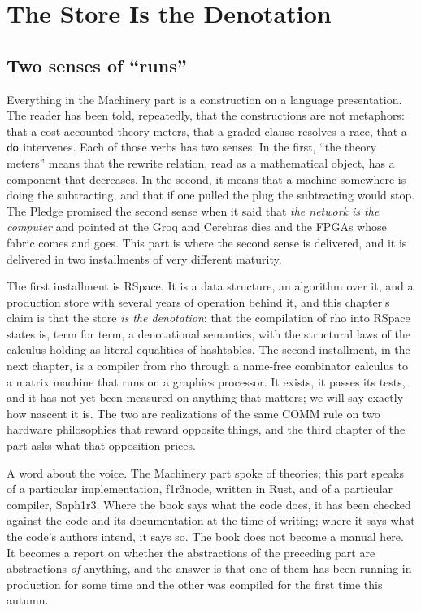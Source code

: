 \chapter{The Store Is the Denotation}
\label{ch:rspace}

\section{Two senses of ``runs''}

Everything in the Machinery part is a construction on a language presentation. The
reader has been told, repeatedly, that the constructions are not metaphors: that a
cost-accounted theory meters, that a graded clause resolves a race, that a $\textsf{do}$
intervenes. Each of those verbs has two senses. In the first, ``the theory meters'' means
that the rewrite relation, read as a mathematical object, has a component that decreases.
In the second, it means that a machine somewhere is doing the subtracting, and that if one
pulled the plug the subtracting would stop. The Pledge promised the second sense when it
said that \emph{the network is the computer} and pointed at the Groq and Cerebras dies
and the FPGAs whose fabric comes and goes. This part is where the second sense is
delivered, and it is delivered in two installments of very different maturity.

The first installment is RSpace. It is a data structure, an algorithm over it, and a
production store with several years of operation behind it, and this chapter's claim is
that the store \emph{is the denotation}: that the compilation of rho into RSpace states is,
term for term, a denotational semantics, with the structural laws of the calculus holding
as literal equalities of hashtables. The second installment, in the next chapter, is a
compiler from rho through a name-free combinator calculus to a matrix machine that runs on
a graphics processor. It exists, it passes its tests, and it has not yet been measured on
anything that matters; we will say exactly how nascent it is. The two are realizations of
the same COMM rule on two hardware philosophies that reward opposite things, and the third
chapter of the part asks what that opposition prices.

A word about the voice. The Machinery part spoke of theories; this part speaks of a
particular implementation, f1r3node, written in Rust, and of a particular compiler,
Saph1r3. Where the book says what the code does, it has been checked against the code and
its documentation at the time of writing; where it says what the code's authors intend,
it says so. The book does not become a manual here. It becomes a report on whether the
abstractions of the preceding part are abstractions \emph{of} anything, and the answer is
that one of them has been running in production for some time and the other was compiled
for the first time this autumn.

